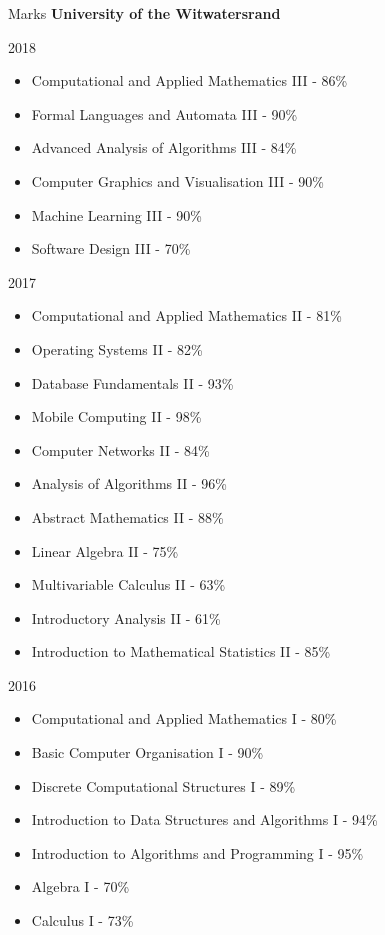 \documentclass{resume} %
\begin{document}
\newpage
\begin{rSection}{Marks}
{\bf University of the Witwatersrand}
\item 2018
\begin{itemize}
	\item Computational and Applied Mathematics III - 86\%
	\item Formal Languages and Automata III - 90\%
	\item Advanced Analysis of Algorithms III - 84\%
	\item Computer Graphics and Visualisation III - 90\%
	\item Machine Learning III - 90\%
	\item Software Design III - 70\%
\end{itemize}
\item 2017
\begin{itemize}
	\item Computational and Applied Mathematics II - 81\%
	\item Operating Systems II - 82\%
	\item Database Fundamentals II - 93\%
	\item Mobile Computing II - 98\%
	\item Computer Networks II - 84\%
	\item Analysis of Algorithms II - 96\%
	\item Abstract Mathematics II - 88\%
	\item Linear Algebra II - 75\%
	\item Multivariable Calculus II - 63\%
	\item Introductory Analysis II - 61\%
	\item Introduction to Mathematical Statistics II - 85\%
\end{itemize}
\item 2016
\begin{itemize}
	\item Computational and Applied Mathematics I - 80\%
	\item Basic Computer Organisation I - 90\%
	\item Discrete Computational Structures I - 89\%
	\item Introduction to Data Structures and Algorithms I - 94\%
	\item Introduction to Algorithms and Programming I - 95\%
	\item Algebra I - 70\%
	\item Calculus I - 73\%

\end{itemize}
\end{rSection}
\end{document}
